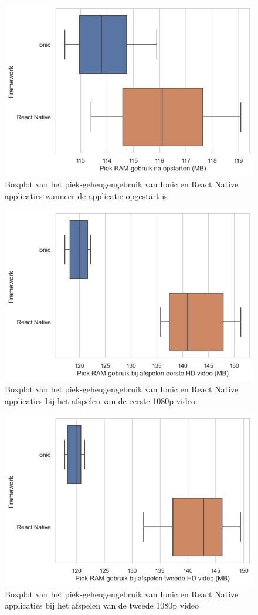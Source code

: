 \begin{figure}
  \centering
  \includegraphics[width=0.7\linewidth]{img/ram/loaded}
  \caption{Boxplot van het piek-geheugengebruik van Ionic en React Native applicaties wanneer de applicatie opgestart is}	
  \label{fig:Boxplot van het piek-geheugengebruik van Ionic en React Native applicaties wanneer de applicatie opgestart is}
\end{figure}

\begin{figure}
  \centering
  \includegraphics[width=0.7\linewidth]{img/ram/HD1}
  \caption{Boxplot van het piek-geheugengebruik van Ionic en React Native applicaties bij het afspelen van de eerste 1080p video}
  \label{fig:Boxplot van het piek-geheugengebruik van Ionic en React Native applicaties bij het afspelen van de eerste 1080p video}
\end{figure}

\begin{figure}
  \centering
  \includegraphics[width=0.7\linewidth]{img/ram/HD2}
  \caption{Boxplot van het piek-geheugengebruik van Ionic en React Native applicaties bij het afspelen van de tweede 1080p video}
  \label{fig:Boxplot van het piek-geheugengebruik van Ionic en React Native applicaties bij het afspelen van de tweede 1080p video}
\end{figure}

